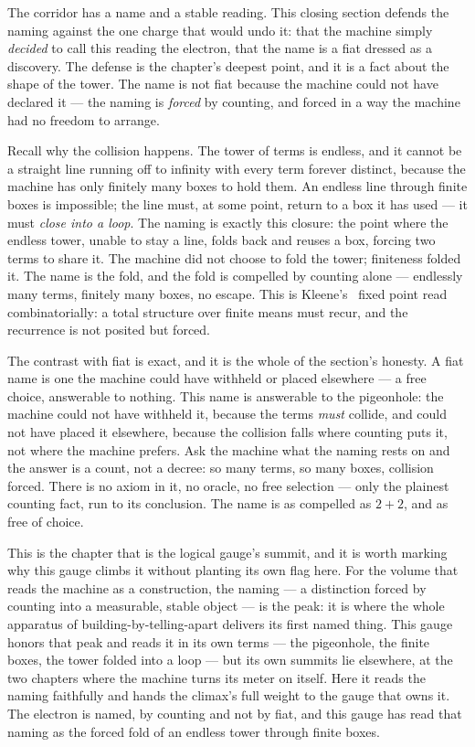 The corridor has a name and a stable reading. This closing section defends the naming against the one charge that would
undo it: that the machine simply \emph{decided} to call this reading the electron, that the name is a fiat dressed as a
discovery. The defense is the chapter's deepest point, and it is a fact about the shape of the tower. The name is not
fiat because the machine could not have declared it --- the naming is \emph{forced} by counting, and forced in a way the
machine had no freedom to arrange.

Recall why the collision happens. The tower of terms is endless, and it cannot be a straight line running off to
infinity with every term forever distinct, because the machine has only finitely many boxes to hold them. An endless
line through finite boxes is impossible; the line must, at some point, return to a box it has used --- it must
\emph{close into a loop}. The naming is exactly this closure: the point where the endless tower, unable to stay a line,
folds back and reuses a box, forcing two terms to share it. The machine did not choose to fold the tower; finiteness
folded it. The name is the fold, and the fold is compelled by counting alone --- endlessly many terms, finitely many
boxes, no escape. This is Kleene's~\cite{kleene1952} fixed point read combinatorially: a total structure over finite
means must recur, and the recurrence is not posited but forced.

The contrast with fiat is exact, and it is the whole of the section's honesty. A fiat name is one the machine could have
withheld or placed elsewhere --- a free choice, answerable to nothing. This name is answerable to the pigeonhole: the
machine could not have withheld it, because the terms \emph{must} collide, and could not have placed it elsewhere,
because the collision falls where counting puts it, not where the machine prefers. Ask the machine what the naming rests
on and the answer is a count, not a decree: so many terms, so many boxes, collision forced. There is no axiom in it, no
oracle, no free selection --- only the plainest counting fact, run to its conclusion. The name is as compelled as $2 + 2$,
and as free of choice.

This is the chapter that is the logical gauge's summit, and it is worth marking why this gauge climbs it without
planting its own flag here. For the volume that reads the machine as a construction, the naming --- a distinction forced
by counting into a measurable, stable object --- is the peak: it is where the whole apparatus of building-by-telling-apart
delivers its first named thing. This gauge honors that peak and reads it in its own terms --- the pigeonhole, the finite
boxes, the tower folded into a loop --- but its own summits lie elsewhere, at the two chapters where the machine turns
its meter on itself. Here it reads the naming faithfully and hands the climax's full weight to the gauge that owns it.
The electron is named, by counting and not by fiat, and this gauge has read that naming as the forced fold of an endless
tower through finite boxes.

